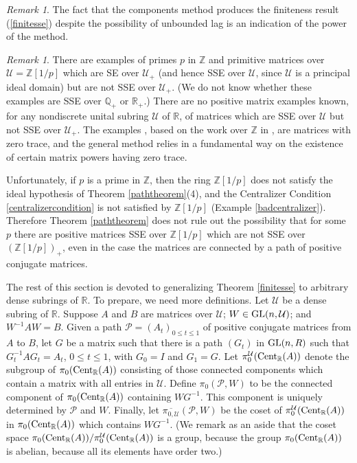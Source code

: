 \documentclass{amsart}
\theoremstyle{definition}
\theoremstyle{remark}
\newtheorem{remark}[theorem]{Remark}
\newcommand{\za}{\textnormal{Cent}_{\mathbb R}(A)}
\numberwithin{equation}{section}
\begin{document}
{{\begin{remark}
The fact that the components method produces the finiteness 
result (\ref{finitesse}) despite the possibility of unbounded 
lag is an indication of the power of the method. 
\end{remark} 


\begin{remark}\label{z1overpremark}
There are examples \cite[Appendix E]{B} 
of primes $p$ in $\mathbb Z$ and 
primitive matrices over 
$\mathcal U= \mathbb Z[1/p]$ which are SE over 
$\mathcal U_+$ (and hence SSE over $\mathcal U$, since 
$\mathcal U$ is a principal ideal domain) 
but are not SSE over $\mathcal U_+$. 
(We do not know whether these examples are SSE over $\mathbb Q_+$ 
or $\mathbb R_+$.) 
 There are no positive 
matrix 
examples known, for any nondiscrete unital subring $\mathcal U$ 
of $\mathbb R$, of matrices which are SSE over $\mathcal 
 U$ but not 
SSE over $\mathcal U_+$. 
The examples \cite[Appendix E]{B}, 
based on the work over $\mathbb Z$ in 
\cite{KR6}, are matrices with zero trace, and the 
general method relies in a fundamental way on 
 the existence 
of certain matrix powers having zero trace.


Unfortunately, if 
 $p$ is a prime in $\mathbb Z$, then 
the ring $\mathbb Z[1/p]$ does not satisfy 
the ideal hypothesis
of Theorem \ref{paththeorem}(4), and the 
Centralizer Condition \ref{centralizercondition} is not satisfied by 
$\mathbb Z[1/p]$  (Example \ref{badcentralizer}). 
Therefore Theorem \ref{paththeorem} does not 
rule out the possibility that for some $p$ there are positive 
matrices SSE over 
$\mathbb Z[1/p]$ 
which are not SSE over 
$(\mathbb Z[1/p])_+$, even in the case the matrices are connected by 
a path of positive conjugate matrices. 
\end{remark} 

The rest of this section is devoted to generalizing Theorem 
\ref{finitesse} to arbitrary dense subrings of $\mathbb R$. 
To prepare, we need more definitions. 
Let $\mathcal U$ be a dense subring of $\mathbb R$. Suppose $A$ and $B$ 
are matrices over $\mathcal U$;  
$W \in  
\textnormal{GL}(n,\mathcal U)$; and 
$W^{-1}AW=B$. 
Given a path $\mathcal P=(A_t)_{0\leq t \leq 1}$ 
of positive conjugate matrices from $A$ to $B$, 
let $G$ be a matrix such that there is a path 
$(G_{t})$ in $\textnormal{GL}(n,R)$  such that 
$G_{t}^{-1}AG_{t}=A_t$, $0\leq t \leq 1$, 
with 
$G_{0}=I$ 
 and $G_{1}=G$. 
Let 
$\pi_0^{\mathcal U}(\za)$ denote the subgroup of 
$\pi_0(\za)$ consisting of those connected components which contain 
a matrix with all entries in $\mathcal U$.
Define 
$\pi_0(\mathcal P,W)$ to be the connected component of 
 $\pi_0(\za)$ containing $WG^{-1}$. This component is uniquely 
determined by $\mathcal P$ and $W$. Finally,  
let $\overline{\pi_{0,\mathcal U}}(\mathcal P,W)$ be the coset of 
$\pi_0^{\mathcal U}(\za)$
 in 
$\pi_0(\za)$ which contains $WG^{-1}$. 
(We remark as an aside that the coset space 
$\pi_0(\za)/
\pi_0^{\mathcal U}(\za)$ 
is a group, because the group  
$\pi_0(\za)$ is abelian, because all its elements 
have order two.)



}}
\end{document}
